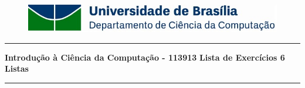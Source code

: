 \documentclass[a4paper, 12pt]{article}
\begin{document}
\begin{figure}[htb]
	\includegraphics[scale=0.9]{UnB_CiC_Logo.jpg}
\end{figure}
\noindent\rule{\textwidth}{0.4pt}
\begin{center}
	\textbf{{\Large Introdução à Ciência da Computação - 113913}} \newline \newline
	\textbf{{\large Lista de Exercícios 6} \\
	\vspace{9pt}
	{\large Listas}} \\
	\noindent\rule{\textwidth}{0.4pt}
	\newline
\end{center}
\end{document}

